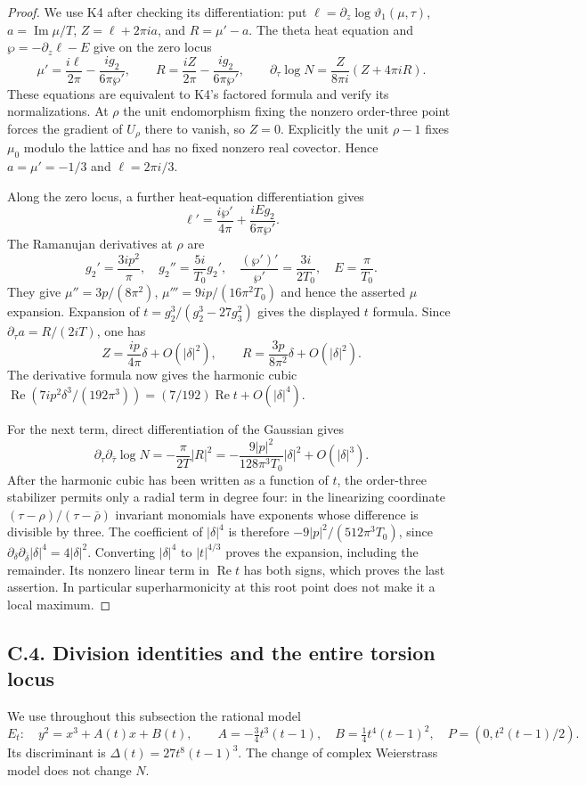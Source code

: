 \begin{proof}
We use K4 after checking its differentiation: put
$\ell=\partial_z\log\vartheta_1(\mu,\tau)$,
$a=\operatorname{Im}\mu/T$, $Z=\ell+2\pi ia$, and
$R=\mu'-a$. The theta heat equation and
$\wp=-\partial_z\ell-E$ give on the zero locus
\[
 \mu'=\frac{i\ell}{2\pi}-\frac{ig_2}{6\pi\wp'},\qquad
 R=\frac{iZ}{2\pi}-\frac{ig_2}{6\pi\wp'},\qquad
 \partial_\tau\log N=\frac{Z}{8\pi i}(Z+4\pi iR).
\]
These equations are equivalent to K4's factored formula and verify
its normalizations. At $\rho$ the unit endomorphism fixing the
nonzero order-three point forces the gradient of $U_\rho$ there to
vanish, so $Z=0$. Explicitly the unit $\rho-1$ fixes $\mu_0$ modulo
the lattice and has no fixed nonzero real covector. Hence
$a=\mu'=-1/3$ and $\ell=2\pi i/3$.

Along the zero locus, a further heat-equation differentiation gives
\[
 \ell'=\frac{i\wp'}{4\pi}+\frac{iEg_2}{6\pi\wp'}.
\]
The Ramanujan derivatives at $\rho$ are
\[
 g_2'=\frac{3ip^2}{\pi},\quad
 g_2''=\frac{5i}{T_0}g_2',\quad
 \frac{(\wp')'}{\wp'}=\frac{3i}{2T_0},\quad E=\frac\pi{T_0}.
\]
They give $\mu''=3p/(8\pi^2)$,
$\mu'''=9ip/(16\pi^2T_0)$ and hence the asserted $\mu$ expansion.
Expansion of $t=g_2^3/(g_2^3-27g_3^2)$ gives the displayed $t$
formula. Since $\partial_\tau a=R/(2iT)$, one has
\[
 Z=\frac{ip}{4\pi}\delta+O(|\delta|^2),\qquad
 R=\frac{3p}{8\pi^2}\delta+O(|\delta|^2).
\]
The derivative formula now gives the harmonic cubic
$\operatorname{Re}(7ip^2\delta^3/(192\pi^3))=(7/192)
\operatorname{Re}t+O(|\delta|^4)$.

For the next term, direct differentiation of the Gaussian gives
\[
 \partial_\tau\partial_{\bar\tau}\log N
       =-\frac\pi{2T}|R|^2
       =-\frac{9|p|^2}{128\pi^3T_0}|\delta|^2+O(|\delta|^3).
\]
After the harmonic cubic has been written as a function of $t$, the
order-three stabilizer permits only a radial term in degree four:
in the linearizing coordinate
$(\tau-\rho)/(\tau-\bar\rho)$ invariant monomials have exponents
whose difference is divisible by three. The coefficient of
$|\delta|^4$ is therefore $-9|p|^2/(512\pi^3T_0)$, since
$\partial_\delta\partial_{\bar\delta}|\delta|^4=4|\delta|^2$.
Converting $|\delta|^4$ to $|t|^{4/3}$ proves the expansion, including
the remainder. Its nonzero linear term in $\operatorname{Re}t$
has both signs, which proves the last assertion. In particular
superharmonicity at this root point does not make it a local maximum.
\end{proof}


\subsection{C.4. Division identities and the entire torsion locus}
We use throughout this subsection the rational model
\[
 E_t:\quad y^2=x^3+A(t)x+B(t),\qquad
 A=-\tfrac34t^3(t-1),\quad B=\tfrac14t^4(t-1)^2,
 \quad P=(0,t^2(t-1)/2).
\]
Its discriminant is $\Delta(t)=27t^8(t-1)^3$.
The change of complex Weierstrass model does not change $N$.

